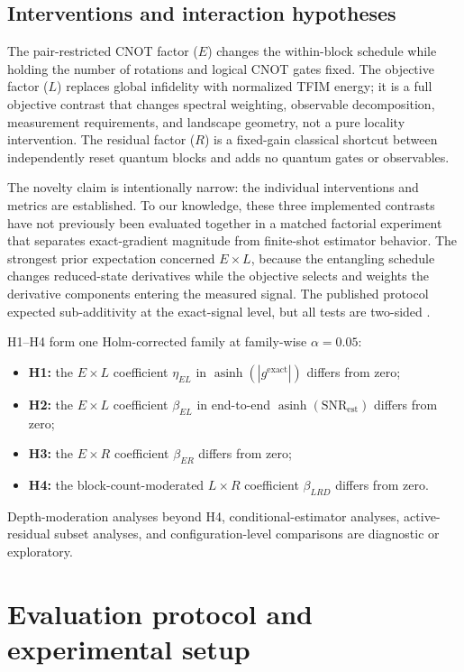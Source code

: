 \documentclass[pdflatex,sn-basic,Numbered]{sn-jnl}
\newcommand{\snrest}{\mathrm{SNR}_{\mathrm{est}}}
\begin{document}
\subsection{Interventions and interaction hypotheses}

The pair-restricted CNOT factor ($E$) changes the within-block schedule while holding the number of rotations and logical CNOT gates fixed. The objective factor ($L$) replaces global infidelity with normalized TFIM energy; it is a full objective contrast that changes spectral weighting, observable decomposition, measurement requirements, and landscape geometry, not a pure locality intervention. The residual factor ($R$) is a fixed-gain classical shortcut between independently reset quantum blocks and adds no quantum gates or observables.

The novelty claim is intentionally narrow: the individual interventions and metrics are established. To our knowledge, these three implemented contrasts have not previously been evaluated together in a matched factorial experiment that separates exact-gradient magnitude from finite-shot estimator behavior. The strongest prior expectation concerned $E\times L$, because the entangling schedule changes reduced-state derivatives while the objective selects and weights the derivative components entering the measured signal. The published protocol expected sub-additivity at the exact-signal level, but all tests are two-sided \cite{shen2026gradient}.

H1--H4 form one Holm-corrected family at family-wise $\alpha=0.05$:
\begin{itemize}
\item \textbf{H1:} the $E\times L$ coefficient $\eta_{EL}$ in $\operatorname{asinh}(|g^{\mathrm{exact}}|)$ differs from zero;
\item \textbf{H2:} the $E\times L$ coefficient $\beta_{EL}$ in end-to-end $\operatorname{asinh}(\snrest)$ differs from zero;
\item \textbf{H3:} the $E\times R$ coefficient $\beta_{ER}$ differs from zero;
\item \textbf{H4:} the block-count-moderated $L\times R$ coefficient $\beta_{LRD}$ differs from zero.
\end{itemize}
Depth-moderation analyses beyond H4, conditional-estimator analyses, active-residual subset analyses, and configuration-level comparisons are diagnostic or exploratory.

\section{Evaluation protocol and experimental setup}\label{sec:methods}
\end{document}
